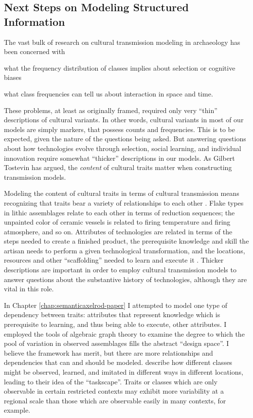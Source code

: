 \subsection{Next Steps on Modeling Structured Information}\label{conc:sec:structured-next-steps}

The vast bulk of research on cultural transmission modeling in archaeology has been concerned with \begin{dissparalist}
\item what the frequency distribution of classes implies about selection or cognitive biases
\item what class frequencies can tell us about interaction in space and time.
\end{dissparalist}  These problems, at least as originally framed, required only very ``thin'' descriptions of cultural variants.  In other words, cultural variants in most of our models are simply markers, that possess counts and frequencies.  This is to be expected, given the nature of the questions being asked.  But answering questions about how technologies evolve through selection, social learning, and individual innovation require somewhat ``thicker'' descriptions in our models.  As Gilbert Tostevin \citeyearpar{tostevin2019content} has argued, the \emph{content} of cultural traits matter when constructing transmission models.

Modeling the content of cultural traits in terms of cultural transmission means recognizing that traits bear a variety of relationships to each other \citep{mesoudi2008learning}.  Flake types in lithic assemblages relate to each other in terms of reduction sequences; the unpainted color of ceramic vessels is related to firing temperature and firing atmosphere, and so on.  Attributes of technologies are related in terms of the steps needed to create a finished product, the prerequisite knowledge and skill the artisan needs to perform a given technological transformation, and the locations, resources and other ``scaffolding'' needed to learn and execute it \citep{wimsatt2007reproducing,wimsatt2019articulating}.  Thicker descriptions are important in order to employ cultural transmission models to answer questions about the substantive history of technologies, although they are vital in this role.   

In Chapter \ref{chap:semanticaxelrod-paper} I attempted to model one type of dependency between traits:  attributes that represent knowledge which is prerequisite to learning, and thus being able to execute, other attributes.  I employed the tools of algebraic graph theory to examine the degree to which the pool of variation in observed assemblages fills the abstract ``design space''.  I believe the framework has merit, but there are more relationships and dependencies that can and should be modeled.  \citet{premo2016cultural} describe how different classes might be observed, learned, and imitated in different ways in different locations, leading to their idea of the ``taskscape''.  Traits or classes which are only observable in certain restricted contexts may exhibit more variability at a regional scale than those which are observable easily in many contexts, for example.  

